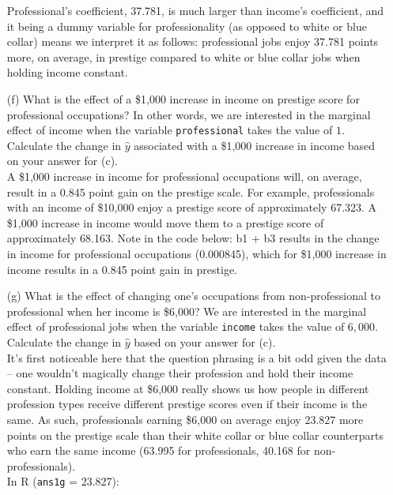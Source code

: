 \documentclass[12pt,letterpaper]{article}
\begin{document}
\begin{enumerate}
	\vspace{.1cm}
		Professional's coefficient, 37.781, is much larger than income's coefficient, and it being a dummy variable for professionality (as opposed to white or blue collar) means we interpret it as follows: professional jobs enjoy 37.781 points more, on average, in prestige compared to white or blue collar jobs when holding income constant. \\
	\vspace{.1cm}
	
	\item [(f)]
	What is the effect of a \$1,000 increase in income on prestige score for professional occupations? In other words, we are interested in the marginal effect of income when the variable \texttt{professional} takes the value of $1$. Calculate the change in $\hat{y}$ associated with a \$1,000 increase in income based on your answer for (c).\\

	\vspace{.1cm}
		A \$1,000 increase in income for professional occupations will, on average, result in a 0.845 point gain on the prestige scale. For example, professionals with an income of \$10,000 enjoy a prestige score of approximately 67.323. A \$1,000 increase in income would move them to a prestige score of approximately 68.163. Note in the code below: b1 + b3 results in the change in income for professional occupations (0.000845), which for \$1,000 increase in income results in a 0.845 point gain in prestige. \\
				 
				 
	\vspace{.1cm}
	
	\item [(g)]
	What is the effect of changing one's occupations from non-professional to professional when her income is \$6,000? We are interested in the marginal effect of professional jobs when the variable \texttt{income} takes the value of $6,000$. Calculate the change in $\hat{y}$ based on your answer for (c).\\
	
	\vspace{.1cm}
		It's first noticeable here that the question phrasing is a bit odd given the data -- one wouldn't magically change their profession and hold their income constant. Holding income at \$6,000 really shows us how people in different profession types receive different prestige scores even if their income is the same. As such, professionals earning \$6,000 on average enjoy 23.827 more points on the prestige scale than their white collar or blue collar counterparts who earn the same income (63.995 for professionals, 40.168 for non-professionals).\\
			In R (\texttt{ans1g} = 23.827):
					 
	\vspace{.1cm}
	
	
\end{enumerate}
\end{document}
